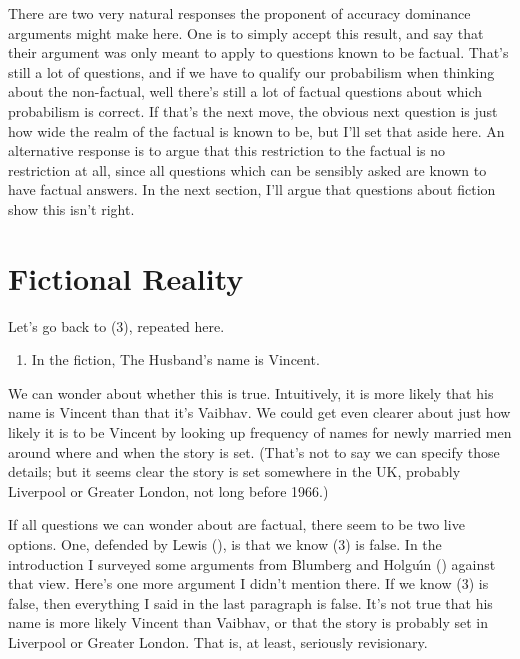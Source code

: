 \documentclass[
  11pt,
  letterpaper,
  DIV=11,
  numbers=noendperiod,
  twoside]{scrartcl}
\providecommand{\tightlist}{%
  \setlength{\itemsep}{0pt}\setlength{\parskip}{0pt}}
\begin{document}
There are two very natural responses the proponent of accuracy dominance
arguments might make here. One is to simply accept this result, and say
that their argument was only meant to apply to questions known to be
factual. That's still a lot of questions, and if we have to qualify our
probabilism when thinking about the non-factual, well there's still a
lot of factual questions about which probabilism is correct. If that's
the next move, the obvious next question is just how wide the realm of
the factual is known to be, but I'll set that aside here. An alternative
response is to argue that this restriction to the factual is no
restriction at all, since all questions which can be sensibly asked are
known to have factual answers. In the next section, I'll argue that
questions about fiction show this isn't right.

\section{Fictional Reality}\label{sec-sec3}

Let's go back to (3), repeated here.

\begin{enumerate}
\def\labelenumi{(\arabic{enumi})}
\setcounter{enumi}{2}
\tightlist
\item
  In the fiction, The Husband's name is Vincent.
\end{enumerate}

We can wonder about whether this is true. Intuitively, it is more likely
that his name is Vincent than that it's Vaibhav. We could get even
clearer about just how likely it is to be Vincent by looking up
frequency of names for newly married men around where and when the story
is set. (That's not to say we can specify those details; but it seems
clear the story is set somewhere in the UK, probably Liverpool or
Greater London, not long before 1966.)

If all questions we can wonder about are factual, there seem to be two
live options. One, defended by Lewis (),
is that we know (3) is false. In the introduction I surveyed some
arguments from Blumberg and Holguı́n
() against that view. Here's one
more argument I didn't mention there. If we know (3) is false, then
everything I said in the last paragraph is false. It's not true that his
name is more likely Vincent than Vaibhav, or that the story is probably
set in Liverpool or Greater London. That is, at least, seriously
revisionary.
\end{document}
